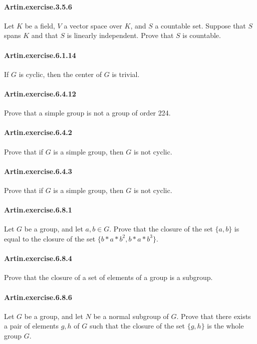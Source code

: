 \documentclass{article}
\begin{document}
\paragraph{Artin.exercise.3.5.6} Let $K$ be a field, $V$ a vector space over $K$, and $S$ a countable set. Suppose that $S$ spans $K$ and that $S$ is linearly independent. Prove that $S$ is countable.

\paragraph{Artin.exercise.6.1.14} If $G$ is cyclic, then the center of $G$ is trivial.

\paragraph{Artin.exercise.6.4.12} Prove that a simple group is not a group of order 224.

\paragraph{Artin.exercise.6.4.2} Prove that if $G$ is a simple group, then $G$ is not cyclic.

\paragraph{Artin.exercise.6.4.3} Prove that if $G$ is a simple group, then $G$ is not cyclic.

\paragraph{Artin.exercise.6.8.1} Let $G$ be a group, and let $a, b \in G$. Prove that the closure of the set $\{a, b\}$ is equal to the closure of the set $\{b*a*b^2, b*a*b^3\}$.

\paragraph{Artin.exercise.6.8.4} Prove that the closure of a set of elements of a group is a subgroup.

\paragraph{Artin.exercise.6.8.6} Let $G$ be a group, and let $N$ be a normal subgroup of $G$. Prove that there exists a pair of elements $g, h$ of $G$ such that the closure of the set $\{g, h\}$ is the whole group $G$.
\end{document}

